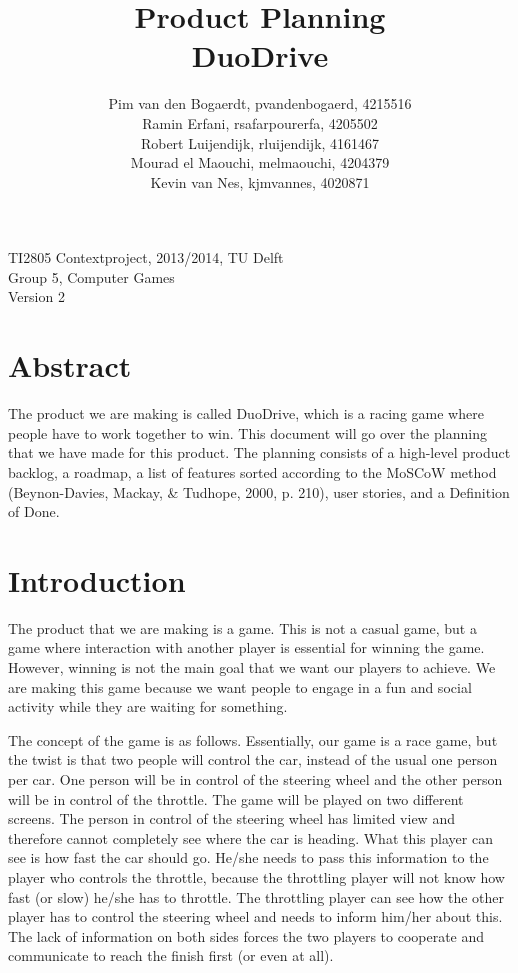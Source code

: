 \documentclass[11pt,twoside,a4paper]{article}
\title{
  Product Planning\\
  DuoDrive
}
\author{
	Pim van den Bogaerdt, pvandenbogaerd, 4215516\\
	Ramin Erfani, rsafarpourerfa, 4205502\\
	Robert Luijendijk, rluijendijk, 4161467\\
	Mourad el Maouchi, melmaouchi, 4204379\\
	Kevin van Nes, kjmvannes, 4020871
}
\begin{document}
\maketitle

\begin{center}
TI2805 Contextproject, 2013/2014, TU Delft\\
Group 5, Computer Games\\
Version 2
\end{center}

\newpage

\section*{Abstract}
The product we are making is called DuoDrive, which is a racing game where people have to work together to win. This document will go over the planning that we have made for this product. The planning consists of a high-level product backlog, a roadmap, a list of features sorted according to the MoSCoW method (Beynon-Davies, Mackay, \& Tudhope, 2000, p. 210), user stories, and a Definition of Done.


\newpage

\tableofcontents


\newpage

\section{Introduction}
The product that we are making is a game. This is not a casual game, but a game where interaction with another player is essential for winning the game. However, winning is not the main goal that we want our players to achieve. We are making this game because we want people to engage in a fun and social activity while they are waiting for something.

The concept of the game is as follows. Essentially, our game is a race game, but the twist is that two people will control the car, instead of the usual one person per car. One person will be in control of the steering wheel and the other person will be in control of the throttle. The game will be played on two different screens. The person in control of the steering wheel has limited view and therefore cannot completely see where the car is heading. What this player can see is how fast the car should go. He/she needs to pass this information to the player who controls the throttle, because the throttling player will not know how fast (or slow) he/she has to throttle. The throttling player can see how the other player has to control the steering wheel and needs to inform him/her about this. The lack of information on both sides forces the two players to cooperate and communicate to reach the finish first (or even at all).
\end{document}

